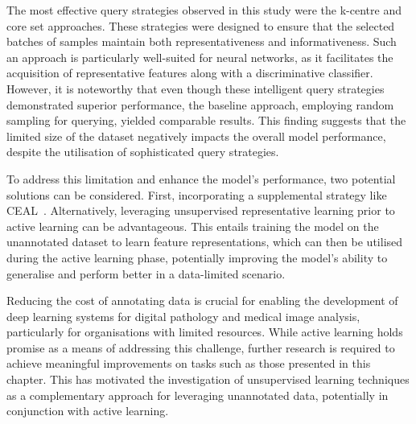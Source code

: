 The most effective query strategies observed in this study were the k-centre and core set approaches. These strategies were designed to ensure that the selected batches of samples maintain both representativeness and informativeness. Such an approach is particularly well-suited for neural networks, as it facilitates the acquisition of representative features along with a discriminative classifier. However, it is noteworthy that even though these intelligent query strategies demonstrated superior performance, the baseline approach, employing random sampling for querying, yielded comparable results. This finding suggests that the limited size of the dataset negatively impacts the overall model performance, despite the utilisation of sophisticated query strategies.

To address this limitation and enhance the model's performance, two potential solutions can be considered. First, incorporating a supplemental strategy like CEAL~\citep{wang2016cost}. Alternatively, leveraging unsupervised representative learning prior to active learning can be advantageous. This entails training the model on the unannotated dataset to learn feature representations, which can then be utilised during the active learning phase, potentially improving the model's ability to generalise and perform better in a data-limited scenario.

Reducing the cost of annotating data is crucial for enabling the development of deep learning systems for digital pathology and medical image analysis, particularly for organisations with limited resources. While active learning holds promise as a means of addressing this challenge, further research is required to achieve meaningful improvements on tasks such as those presented in this chapter. This has motivated the investigation of unsupervised learning techniques as a complementary approach for leveraging unannotated data, potentially in conjunction with active learning.